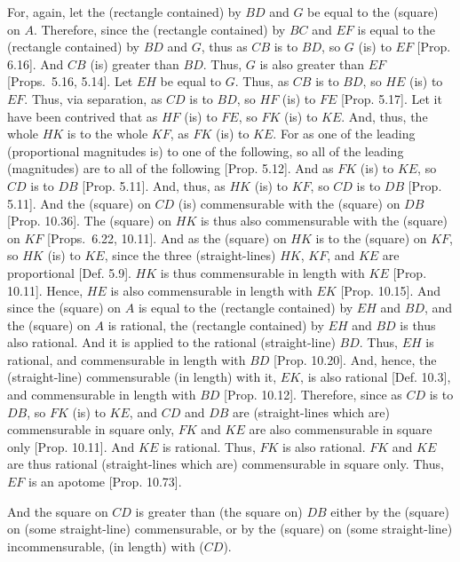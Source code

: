 \begin{Parallel}{}{}
{For, again, let the (rectangle contained) by $BD$ and $G$  be equal
to the (square) on $A$. Therefore, since the (rectangle contained) by $BC$
and $EF$ is equal to the (rectangle contained) by $BD$ and $G$, thus as
$CB$ is to $BD$, so $G$ (is) to $EF$ [Prop. 6.16].
And $CB$ (is) greater than $BD$. Thus, $G$ is also greater than $EF$
[Props.~5.16, 5.14].
Let $EH$ be equal to $G$. Thus, as $CB$ is to $BD$, so $HE$
(is) to $EF$. Thus, via separation, as $CD$ is to $BD$, so $HF$ (is) to $FE$
[Prop. 5.17]. Let it have been contrived that as
$HF$ (is) to $FE$, so $FK$ (is) to $KE$. And, thus, the
whole $HK$ is to the whole $KF$, as $FK$ (is) to $KE$.
For as one of the leading (proportional magnitudes is) to one of
the following, so all of the leading (magnitudes) are to all of the
following [Prop. 5.12]. And as $FK$
(is) to $KE$, so $CD$ is to $DB$ [Prop. 5.11].  And, thus, as $HK$ (is) to $KF$, so
$CD$ is to $DB$ [Prop. 5.11].
And the (square) on  $CD$ (is) 
 commensurable with the (square) on $DB$ [Prop. 10.36]. The (square) on $HK$ is
 thus also commensurable with the (square) on $KF$ [Props.~6.22, 10.11].
  And as the (square) on $HK$ is to the (square) on $KF$, so $HK$ (is)
  to $KE$, since the three (straight-lines) $HK$, $KF$, and $KE$ are
  proportional [Def. 5.9]. $HK$ is thus commensurable
  in length with $KE$ [Prop. 10.11]. 
  Hence, $HE$ is also commensurable in length with $EK$
  [Prop. 10.15]. And since the (square) on $A$
  is equal to the (rectangle contained) by $EH$ and $BD$, and the (square)
  on $A$ is rational, the (rectangle contained) by $EH$ and $BD$ is thus
  also rational. And it is applied to the rational (straight-line) $BD$.
  Thus, $EH$ is  rational, and commensurable in length with $BD$ [Prop. 10.20]. And, hence, the (straight-line)
  commensurable (in length) with it, $EK$, is also rational [Def. 10.3], and commensurable
  in length with $BD$ [Prop. 10.12].  Therefore,
  since as $CD$  is to $DB$, so $FK$ (is) to $KE$, and $CD$ and $DB$
  are (straight-lines which are) commensurable in square only, $FK$ and $KE$ are also
  commensurable in square only [Prop. 10.11]. 
  And $KE$ is rational. Thus, $FK$ is also rational. $FK$ and
  $KE$ are thus rational (straight-lines which are) commensurable in square
  only. Thus, $EF$ is an apotome [Prop. 10.73].
  
  And the square on $CD$ is greater than (the square on) $DB$ either
  by the (square) on (some straight-line) commensurable, or by the
  (square) on (some straight-line) incommensurable, (in length) with ($CD$).
  
}
\end{Parallel}
